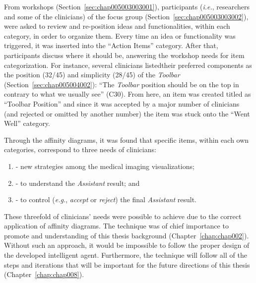 From workshops (Section~\ref{sec:chap005003003001}), participants ({\it i.e.}, researchers and some of the clinicians) of the focus group (Section~\ref{sec:chap005003003002}), were asked to review and re-position ideas and functionalities, within each category, in order to organize them.
Every time an idea or functionality was triggered, it was inserted into the ``Action Items'' category.
After that, participants discuss where it should be, answering the workshop needs for item categorization.
For instance, several clinicians listed\footnotemark[32] their preferred components as the position (32/45) and simplicity (28/45) of the {\it Toolbar} (Section~\ref{sec:chap005004002}):
``The {\it Toolbar} position should be on the top in contrary to what we usually see'' (C30).
From here, an item was created titled as ``Toolbar Position'' and since it was accepted by a major number of clinicians (and rejected or omitted by another number) the item was stuck onto the ``Went Well'' category.


\vspace{0.05mm}

\noindent
Through the affinity diagrams, it was found that specific items, within each own categories, correspond to three needs of clinicians:

\vspace{0.10mm}

\begin{enumerate}[label=\alph*]
\item - new strategies among the medical imaging visualizations;
\item - to understand the {\it Assistant} result; and
\item - to control ({\it e.g.}, {\it accept} or {\it reject}) the final {\it Assistant} result.
\end{enumerate}

\vspace{0.10mm}

These threefold of clinicians' needs were possible to achieve due to the correct application of affinity diagrams.
The technique was of chief importance to promote and understanding of this thesis background (Chapter~\ref{chap:chap002}).
Without such an approach, it would be impossible to follow the proper design of the developed intelligent agent.
Furthermore, the technique will follow all of the steps and iterations that will be important for the future directions of this thesis (Chapter~\ref{chap:chap008}).

